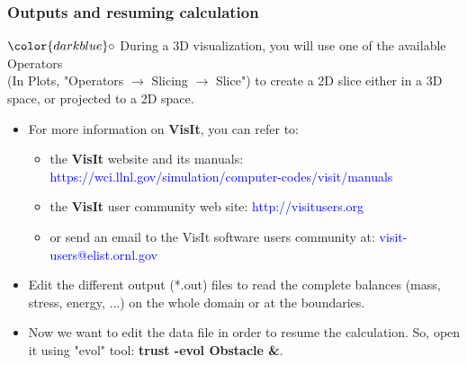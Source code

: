 \documentclass[10pt, hyperref={unicode=true,pdfusetitle, bookmarks=true,bookmarksnumbered=false,bookmarksopen=false, breaklinks=false,pdfborder={0 0l 1},backref=true,colorlinks=true,linkcolor=darkblue,pageanchor}]{beamer}
\begin{document}
\begin{frame}
\frametitle{Outputs and resuming calculation}
\begin{block}{}

\hspace{1cm} $\color{darkblue}\circ$ {\small{During a 3D visualization, you will use one of the available Operators \\
\hspace{1.3cm} (In Plots, "Operators $\rightarrow$ Slicing $\rightarrow$ Slice") to create a 2D slice either in a 3D \\
\hspace{1.3cm} space, or projected to a 2D space.}}

\begin{itemize}
\item For more information on \textbf{VisIt}, you can refer to: 
    \begin{itemize}
    \item [$\circ$] the \textbf{VisIt} website and its manuals: \textcolor{blue}{https://wci.llnl.gov/simulation/computer-codes/visit/manuals}
    \item [$\circ$] the \textbf{VisIt} user community web site: \textcolor{blue}{http://visitusers.org}
    \item [$\circ$] or send an email to the VisIt software users community at: \textcolor{blue}{visit-users@elist.ornl.gov}
    \end{itemize}

\item Edit the different output (*.out) files to read the complete balances (mass, stress, energy, ...) on the whole domain or at the boundaries.

\item Now we want to edit the data file in order to resume the calculation. So, open it using "evol" tool: \textbf{trust -evol Obstacle \&}.
\end{itemize}

\end{block}
\end{frame}
\end{document}

